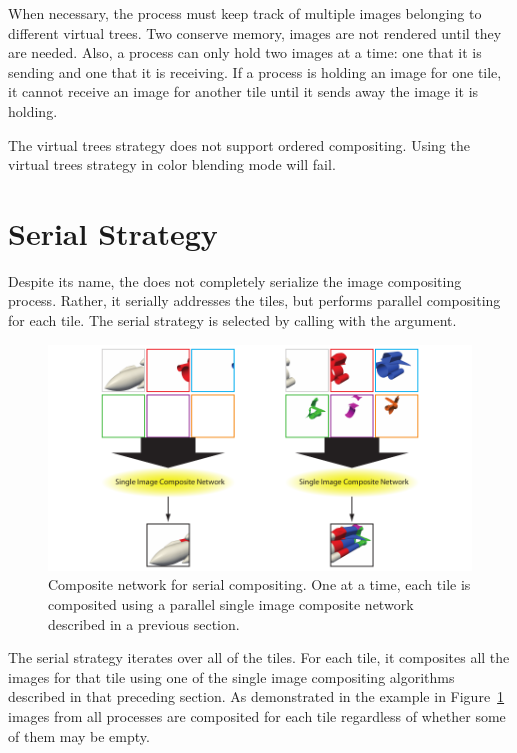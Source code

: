 When necessary, the process must keep track of multiple images belonging to
different virtual trees.  Two conserve memory, images are not rendered
until they are needed.  Also, a process can only hold two images at a time:
one that it is sending and one that it is receiving.  If a process is
holding an image for one tile, it cannot receive an image for another tile
until it sends away the image it is holding.

The virtual trees strategy does not support ordered compositing.  Using the
virtual trees strategy in color blending mode will fail.


\section{Serial Strategy}
\label{sec:Strategies:Serial}


Despite its name, the  does not completely
serialize the image compositing process.  Rather, it serially addresses the
tiles, but performs parallel compositing for each tile.  The serial
strategy is selected by calling  with the
 argument.

\begin{figure}
  \centering
  \includegraphics{images/SerialComposite}
  \caption[Serial compositing network.]{Composite network for serial
    compositing.  One at a time, each tile is composited using a parallel
    single image composite network described in a previous section.}
  \label{fig:SerialComposite}
\end{figure}

The serial strategy iterates over all of the tiles.  For each tile, it
composites all the images for that tile using one of the single image
compositing algorithms described in that preceding section.  As
demonstrated in the example in Figure~\ref{fig:SerialComposite} images from
all processes are composited for each tile regardless of whether some of
them may be empty.

